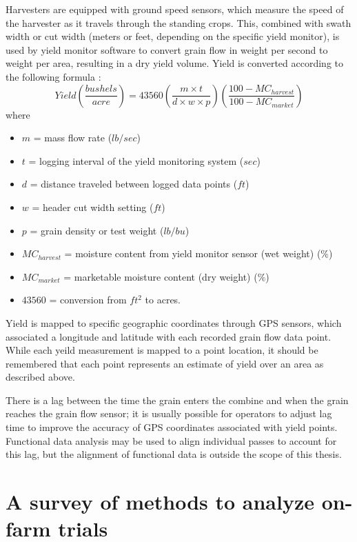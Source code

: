 \documentclass[phdcss]{SDSUThesis}
\begin{document}
Harvesters are equipped with ground speed sensors, which measure the speed of the harvester as it travels through the standing crops. This, combined with swath width or cut width (meters or feet, depending on the specific yield monitor), is used by yield monitor software to convert grain flow in weight per second to weight per area, resulting in a dry yield volume. Yield is converted according to the following formula  \cite{luck-2014} :
\begin{equation}
Yield \left( \frac{bushels}{acre} \right) = 43560 \left( \frac{m \times t}{d \times w \times p} \right) \left( \frac{100-MC_{harvest}}{100-MC_{market}} \right)
\end{equation}
where
\begin{itemize}
\item $m$ = mass flow rate ($lb/sec$)
\item $t$ = logging interval of the yield monitoring system ($sec$)
\item $d$ = distance traveled between logged data points ($ft$)
\item $w$ = header cut width setting ($ft$)
\item $p$ = grain density or test weight ($lb/bu$)
\item $MC_{harvest}$ = moisture content from yield monitor sensor (wet weight) ($\%$)
\item $MC_{market}$ = marketable moisture content (dry weight) ($\%$)
\item $43560$ = conversion from $ft^2$ to acres.
\end{itemize}

Yield is mapped to specific geographic coordinates through GPS sensors, which associated a longitude and latitude with each recorded grain flow data point. While each yeild measurement is mapped to a point location, it should be remembered that each point represents an estimate of yield over an area as described above. 

There is a lag between the time the grain enters the combine and when the grain reaches the grain flow sensor; it is usually possible for operators to adjust lag time to improve the accuracy of GPS coordinates associated with yield points. Functional data analysis may be used to align \cite{bivand.r-2013} individual passes to account for this lag, but the alignment of functional data is outside the scope of this thesis.

\clearpage

\section{A survey of methods to analyze on-farm trials}
\end{document}
